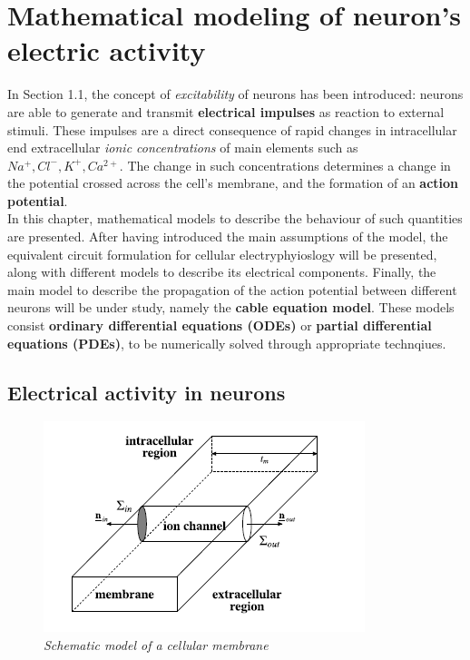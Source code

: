\documentclass[a4paper]{article}
\begin{document}
	
	
	
\section{Mathematical modeling of neuron's electric activity}

In Section 1.1, the concept of \textit{excitability} of neurons has been introduced: neurons are able to generate and transmit \textbf{electrical impulses} as reaction to external stimuli. These impulses are a direct consequence of rapid changes in intracellular end extracellular \textit{ionic concentrations} of main elements such as $Na^+, Cl^-, K^+, Ca^{2+}$. The change in such concentrations determines a change in the potential crossed across the cell's membrane, and the formation of an \textbf{action potential}. \\
In this chapter, mathematical models to describe the behaviour of such quantities are presented. After having introduced the main assumptions of the model, the equivalent circuit formulation for cellular electryphyioslogy will be presented, along with different models to describe its electrical components. Finally, the main model to describe the propagation of the action potential between different neurons will be under study, namely the \textbf{cable equation model}. These models consist \textbf{ordinary differential equations (ODEs)} or \textbf{partial differential equations (PDEs)}, to be numerically solved through appropriate technqiues.

\subsection{Electrical activity in neurons}

\begin{figure}[H]
	\begin{center}
		\includegraphics[scale=0.77]{intra.png} 
	\end{center} 
	\caption{\textit{Schematic model of a cellular membrane}}
	
\end{figure}
\end{document}
